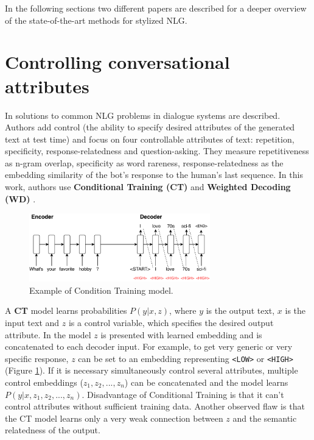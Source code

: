 In the following sections two different papers are described for a deeper overview of the state-of-the-art methods for stylized NLG.

\section{Controlling conversational attributes}

In \cite{see2019makes} solutions to common NLG problems in dialogue systems are described. Authors add control (the ability to specify desired attributes of the generated text at test time) and focus on four controllable attributes of text: repetition, specificity, response-relatedness and question-asking. They measure repetitiveness as n-gram overlap, specificity as word rareness, response-relatedness as the embedding similarity of the bot’s response to the human’s last sequence. In this work, authors use \textbf{Conditional Training (CT)} \cite{peng2018towards} and \textbf{Weighted Decoding (WD)} \cite{ghazvininejad2017hafez}. 

\begin{figure}[hbt]
  \centering
  \includegraphics[width=0.7\textwidth]{figures/ct.pdf}
  \caption{Example of Condition Training model.}
  \label{fig:ct}
\end{figure}

A \textbf{CT} model learns probabilities $P(y|x,z)$, where $y$ is the output text, $x$ is the input text and $z$ is a control variable, which specifies the desired output attribute. In the model $z$ is presented with learned embedding and is concatenated to each decoder input. For example, to get very generic or very specific response, $z$ can be set to an embedding representing \texttt{<LOW>} or \texttt{<HIGH>} (Figure \ref{fig:ct}). If it is necessary simultaneously control several attributes, multiple control embeddings ($z_1, z_2, ..., z_n$) can be concatenated and the model learns $P(y|x, z_1, z_2, ..., z_n)$. Disadvantage of Conditional Training is that it can’t control attributes without sufficient training data. Another observed flaw is that the CT model learns only a very weak connection between $z$ and the semantic relatedness of the output.

